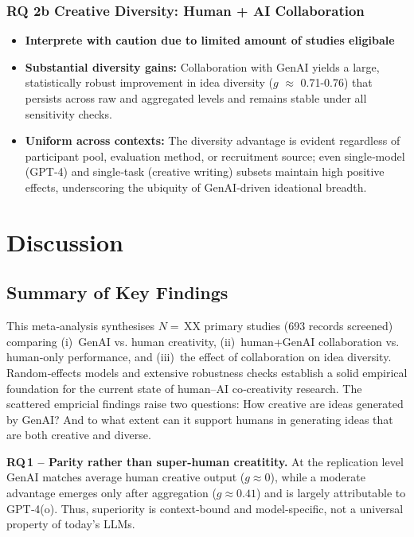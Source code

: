 \documentclass[manuscript, screen, review, acmsmall, anonymous]{acmart}
\begin{document}
\subsubsection{RQ 2b Creative Diversity: Human + AI Collaboration}
\begin{itemize}
\item \textbf{Interprete with caution due to limited amount of studies eligibale}
\item \textbf{Substantial diversity gains:} Collaboration with GenAI yields a large, statistically robust improvement in idea diversity ($g$ $\approx$ 0.71-0.76) that persists across raw and aggregated levels and remains stable under all sensitivity checks.
\item \textbf{Uniform across contexts:} The diversity advantage is evident regardless of participant pool, evaluation method, or recruitment source; even single‑model (GPT‑4) and single‑task (creative writing) subsets maintain high positive effects, underscoring the ubiquity of GenAI‑driven ideational breadth.
\end{itemize}




\section{Discussion}
\label{sec:discussion}



\subsection{Summary of Key Findings}

This meta‑analysis synthesises $N=\,$XX primary studies (693 records screened) comparing (i)~GenAI vs. human creativity, (ii)~human+GenAI collaboration vs. human‑only performance, and (iii)~the effect of collaboration on idea diversity. Random‑effects models and extensive robustness checks establish a solid empirical foundation for the current state of human–AI co‑creativity research. The scattered empricial findings raise two questions: How creative are ideas generated by GenAI? And to what extent can it support humans in generating ideas that are both creative and diverse. 


\textbf{RQ\,1 – Parity rather than super-human creatitity.} At the replication level GenAI matches average human creative output ($g \approx 0$), while a moderate advantage emerges only after aggregation ($g \approx 0.41$) and is largely attributable to GPT‑4(o). Thus, superiority is context‑bound and model‑specific, not a universal property of today’s LLMs.
\end{document}

